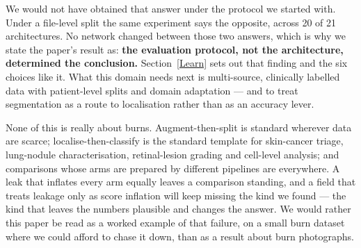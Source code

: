 \documentclass{melba}
\begin{document}
We would not have obtained that answer under the protocol we started with. Under a file-level split the same experiment says the opposite, across 20 of 21 architectures. No network changed between those two answers, which is why we state the paper's result as: \textbf{the evaluation protocol, not the architecture, determined the conclusion.} Section~\ref{Learn} sets out that finding and the six choices like it. What this domain needs next is multi-source, clinically labelled data with patient-level splits and domain adaptation --- and to treat segmentation as a route to localisation rather than as an accuracy lever.

None of this is really about burns. Augment-then-split is standard wherever data are scarce; localise-then-classify is the standard template for skin-cancer triage, lung-nodule characterisation, retinal-lesion grading and cell-level analysis; and comparisons whose arms are prepared by different pipelines are everywhere. A leak that inflates every arm equally leaves a comparison standing, and a field that treats leakage only as score inflation will keep missing the kind we found --- the kind that leaves the numbers plausible and changes the answer. We would rather this paper be read as a worked example of that failure, on a small burn dataset where we could afford to chase it down, than as a result about burn photographs.
\end{document}
